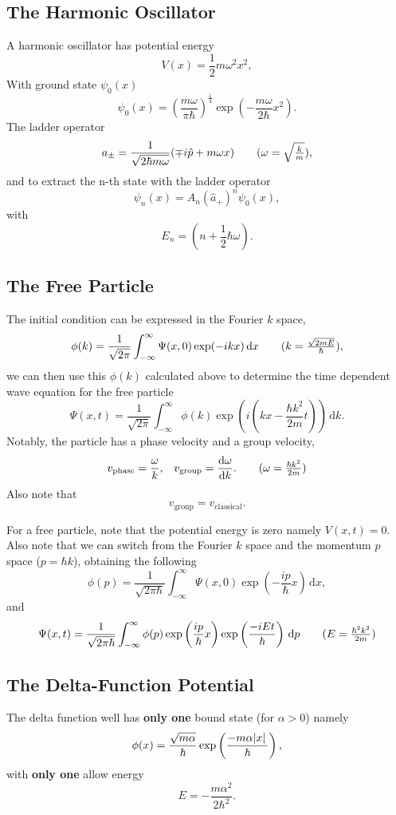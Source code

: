 \documentclass[a4paper]{article}
\newcommand{\dmr}[1]{\, \mathrm{d}#1} %
\begin{document}
\subsection{The Harmonic Oscillator}
\par A harmonic oscillator has potential energy
\begin{equation*}
    V(x) = \frac12 m \omega^2 x^2,
\end{equation*}
With ground state $\psi_{0}(x)$ 
\[
    \psi_0(x)=\left(\frac{m \omega}{\pi \hbar}\right)^{\frac{1}{4}}\exp\left(-\frac{m \omega}{2\hbar}x^2\right).
\]
The ladder operator
\[
    a_{\pm}=\frac{1}{\sqrt{2\hbar m \omega}}(\mp i \hat{p}+m\omega x)\tag{$\omega = \sqrt{\frac{k}{m}}$},
\]
and to extract the n-th state with the ladder operator
\[
    \psi_{n}(x)=A_n(\hat{a}_{+})^{n}\psi_{0}(x),
\]
with 
\[
    E_{n} = \left(n+\frac12\hbar\omega\right).   
\]
\subsection{The Free Particle}
The initial condition can be expressed in the Fourier $k$ space,
\[
    \phi(k)=\frac{1}{\sqrt{2\pi}}\int_{-\infty}^{\infty}\Psi(x,0)\exp(-ikx)\dmr{x} \tag{\(k = \frac{\sqrt{2mE}}{\hbar}\)},
\]
we can then use this $\phi(k)$ calculated above to determine the time dependent wave equation for the free particle
\[
    \Psi(x,t)=\frac{1}{\sqrt{2\pi}}\int_{-\infty}^{\infty}\phi(k)\exp\left(i\left(kx-\frac{\hbar k^2}{2m}t\right)\right)\dmr{k}.
\]
Notably, the particle has a phase velocity and a group velocity,
\begin{align*}
    v_{\text{phase}}=\frac{\omega}{k}, && v_{\text{group}}=\dv{\omega}{k}.\tag{$\omega = \frac{\hbar k^2}{2m}$}
\end{align*}
Also note that 
\[
    v_{\text{group}} = v_{\text{classical}}.
\]

\par For a free particle, note that the potential energy is zero namely \(V(x,t)=0\). Also note that we can switch from the Fourier $k$ space and the momentum $p$ space (\(p = \hbar k\)), obtaining the following
\[
    \phi(p) = \frac{1}{\sqrt{2\pi\hbar}}\int_{-\infty}^{\infty}\Psi(x,0)\exp(-\frac{ip}{\hbar}x)\dmr{x},
\]
and
\[
    \Psi(x,t) = \frac{1}{\sqrt{2 \pi\hbar }}\int_{-\infty}^{\infty} \phi(p) \exp \left(\frac{ip}{\hbar}x\right)\exp\left(\frac{-i E t}{\hbar}\right) \dmr{p}\tag{$E = \frac{\hbar^2k^2}{2m}$}
\]  

\subsection{The Delta-Function Potential}
\par The delta function well has \textbf{only one} bound state (for $\alpha > 0$) namely
\[
    \phi(x) = \frac{\sqrt{m\alpha}}{\hbar}\exp\left(\frac{-m\alpha\abs*{x}}{\hbar}\right),    
\]
with \textbf{only one} allow energy
\[
    E = -\frac{m\alpha^2}{2\hbar^2}.
\]
\end{document}
